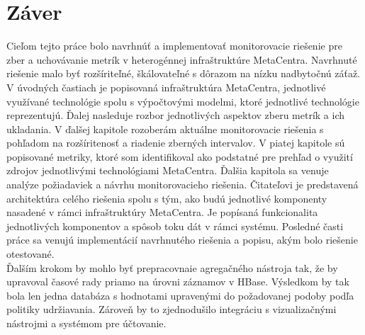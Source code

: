 \documentclass[printed,11pt,twoside,color,cover,table]{fithesis3}
\begin{document}
\chapter{Záver}
Cieľom tejto práce bolo navrhnúť a implementovať monitorovacie riešenie pre zber a uchovávanie metrík v heterogénnej infraštruktúre MetaCentra. 
Navrhnuté riešenie malo byť rozšíriteľné, škálovateľné  s dôrazom na nízku nadbytočnú záťaž.
\\V úvodných častiach je popisovaná infraštruktúra MetaCentra, jednotlivé využívané technológie spolu s výpočtovými modelmi, ktoré
jednotlivé technológie reprezentujú. Ďalej nasleduje rozbor jednotlivých aspektov zberu metrík a ich ukladania.
V ďalšej kapitole rozoberám aktuálne monitorovacie riešenia s pohľadom na rozšíritenosť a riadenie zberných intervalov. V piatej kapitole
sú popisované metriky, ktoré som identifikoval ako podstatné pre prehľad o využití zdrojov jednotlivými technológiami MetaCentra.
Ďalšia kapitola sa venuje analýze požiadaviek a návrhu monitorovacieho riešenia. Čitateľovi je predstavená architektúra celého 
riešenia spolu s tým, ako budú jednotlivé komponenty nasadené v rámci infraštruktúry MetaCentra. Je popísaná funkcionalita
jednotlivých komponentov a spôsob toku dát v rámci systému. Posledné časti práce sa venujú implementácií navrhnutého riešenia a popisu,
akým bolo riešenie otestované.
\\Ďalším krokom by mohlo byť prepracovnaie agregačného 
nástroja tak, že by upravoval časové rady priamo na úrovni záznamov v HBase. Výsledkom by tak bola len jedna databáza s hodnotami upravenými
do požadovanej podoby podľa politiky udržiavania. Zároveň by to zjednodušilo integráciu s vizualizačnými nástrojmi a systémom pre účtovanie.

\printbibliography[heading=bibintoc]
\end{document}
